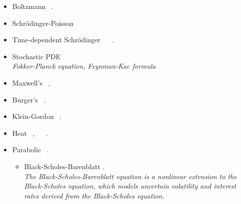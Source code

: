 \documentclass[12pt,letterpaper]{article}
\begin{document}
\begin{itemize}
\begin{itemize}
\begin{itemize}
                    \item Boltzmann  ~\cite{jinQuantumSimulationPartial2022a}.
                    
                    \item Schrödinger-Poisson ~~\cite{Mocz_2021}
                    
                    \item Time-dependent Schrödinger ~\cite{joubert-doriolVariationalApproachLinearly2022}  ~\cite{jinQuantumSimulationSemiclassical2022}.
                    \item Stochastic PDE  ~\cite{PhysRevA.103.052425, Alghassi2022variationalquantum}\\            
                   \textit{Fokker-Planck equation, Feynman-Kac formula}

                   \item Maxwell's  ~\cite{costaQuantumAlgorithmSimulating2019}, ~\cite{novikau_quantum_2021,novikauSimulationLinearNonHermitian2022}

                   \item Burger's  ~\cite{ozSolvingBurgersEquation2021}.

                   \item Klein-Gordon  ~\cite{costaQuantumAlgorithmSimulating2019}.

                   \item Heat ~\cite{fontanela_short_2021,miyamoto_pricing_2022,leongVariationalQuantumEvolution2022a,albinoSolvingPartialDifferential2022},  ~\cite{lindenQuantumVsClassical2022,jinQuantumSimulationPartial2022,jinTimeComplexityAnalysis2022a} ~\cite{jinQuantumSimulationPartial2022a}.

                    \item Parabolic ~\cite{patelQuantumInspiredTensorNeural2022}.
                    \begin{itemize}
                        \item Black-Scholes-Barenblatt  \cite{patelQuantumInspiredTensorNeural2022}. \\
                            \textit{The Black-Scholes-Barenblatt equation is a nonlinear extension to the Black-Scholes equation, which models uncertain volatility and interest rates derived from the Black-Scholes equation.}
                        

\end{itemize}
\end{itemize}
\end{itemize}
\end{itemize}
\end{document}

